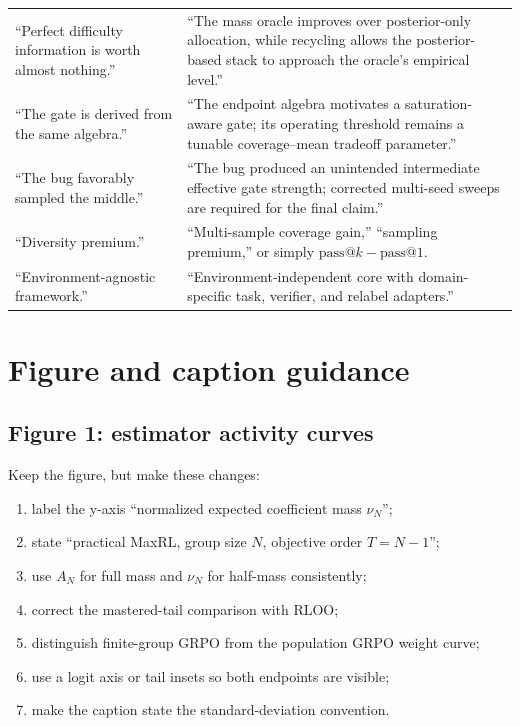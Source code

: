 \documentclass[11pt]{article}
\makeatletter
\newcommand{\PassAt}[1]{\mathrm{pass@}#1}
\theoremstyle{definition}
\theoremstyle{remark}
\makeatother
\begin{document}
\begin{longtable}{p{}p{}}
\addlinespace
``Perfect difficulty information is worth almost nothing.'' & ``The mass oracle improves over posterior-only allocation, while recycling allows the posterior-based stack to approach the oracle's empirical level.''\\
\addlinespace
``The gate is derived from the same algebra.'' & ``The endpoint algebra motivates a saturation-aware gate; its operating threshold remains a tunable coverage--mean tradeoff parameter.''\\
\addlinespace
``The bug favorably sampled the middle.'' & ``The bug produced an unintended intermediate effective gate strength; corrected multi-seed sweeps are required for the final claim.''\\
\addlinespace
``Diversity premium.'' & ``Multi-sample coverage gain,'' ``sampling premium,'' or simply $\PassAt{k}-\PassAt{1}$.\\
\addlinespace
``Environment-agnostic framework.'' & ``Environment-independent core with domain-specific task, verifier, and relabel adapters.''\\
\bottomrule
\end{longtable}
\normalsize

\section{Figure and caption guidance}

\subsection{Figure 1: estimator activity curves}

Keep the figure, but make these changes:

\begin{enumerate}[leftmargin=2em]
\item label the y-axis ``normalized expected coefficient mass $\nu_N$'';
\item state ``practical MaxRL, group size $N$, objective order $T=N-1$'';
\item use $A_N$ for full mass and $\nu_N$ for half-mass consistently;
\item correct the mastered-tail comparison with RLOO;
\item distinguish finite-group GRPO from the population GRPO weight curve;
\item use a logit axis or tail insets so both endpoints are visible;
\item make the caption state the standard-deviation convention.
\end{enumerate}
\end{document}
